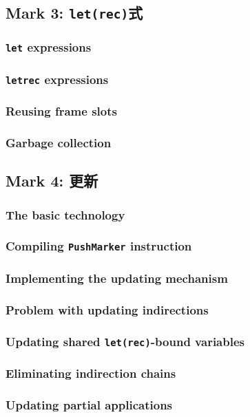 \documentclass{jarticle}
\begin{document}
\subsection{Mark 3: \texttt{let(rec)}式}
\subsubsection{\texttt{let} expressions}
\subsubsection{\texttt{letrec} expressions}
\subsubsection{Reusing frame slots \dag}
\subsubsection{Garbage collection \dag}

\subsection{Mark 4: 更新}
\subsubsection{The basic technology}
\subsubsection{Compiling \texttt{PushMarker} instruction}
\subsubsection{Implementing the updating mechanism}
\subsubsection{Problem with updating indirections}
\subsubsection{Updating shared \texttt{let(rec)}-bound variables}
\subsubsection{Eliminating indirection chains}
\subsubsection{Updating partial applications}
\end{document}

